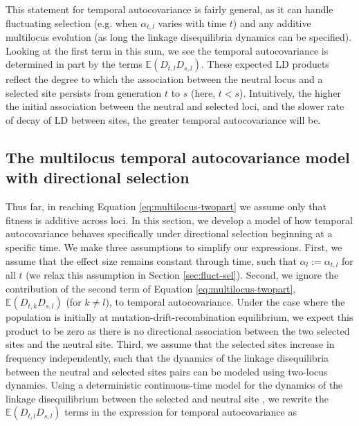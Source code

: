 \documentclass[11pt]{article}
\newcommand{\E}{\mathbb{E}}
\begin{document}
This statement for temporal autocovariance is fairly general, as it can handle
fluctuating selection (e.g. when $\alpha_{t,l}$ varies with time $t$) and any
additive multilocus evolution (as long the linkage disequilibria dynamics can
be specified). Looking at the first term in this sum, we see the temporal
autocovariance is determined in part by the terms $\E(D_{t,l} D_{s,l})$. These
expected LD products reflect the degree to which the association between the
neutral locus and a selected site persists from generation $t$ to $s$ (here, $t
< s$). Intuitively, the higher the initial association between the neutral and
selected loci, and the slower rate of decay of LD between sites, the greater
temporal autocovariance will be.

\subsection{The multilocus temporal autocovariance model with directional selection}
\label{sec:temp-autocov-dirsel}

Thus far, in reaching Equation \eqref{eq:multilocus-twopart} we assume only
that fitness is additive across loci. In this section, we develop a model of
how temporal autocovariance behaves specifically under directional selection
beginning at a specific time. We make three assumptions to simplify our
expressions. First, we assume that the effect size remains constant through
time, such that $\alpha_l := \alpha_{t,l}$ for all $t$ (we relax this
assumption in Section \ref{sec:fluct-sel}). Second, we ignore the contribution
of the second term of Equation \eqref{eq:multilocus-twopart}, $\E(D_{t,k}
D_{s,l})$ (for $k \ne l$), to temporal autocovariance. Under the case where the
population is initially at mutation-drift-recombination equilibrium, we expect
this product to be zero as there is no directional association between the two
selected sites and the neutral site. Third, we assume that the selected sites
increase in frequency independently, such that the dynamics of the linkage
disequilibria between the neutral and selected sites pairs can be modeled using
two-locus dynamics. Using a deterministic continuous-time model for the
dynamics of the linkage disequilibrium between the selected and neutral site
\parencite{Maynard_Smith1974-lc,Barton2000-zg}, we rewrite the $\E(D_{t,l}
D_{s,l})$ terms in the expression for temporal autocovariance as
\end{document}
